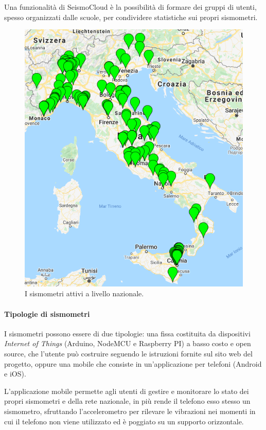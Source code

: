 Una funzionalità di SeismoCloud è la possibilità di formare dei gruppi di utenti, spesso organizzati dalle scuole, per condividere statistiche sui propri sismometri.
\begin{figure}[ht]
\centering
\includegraphics[scale=0.35]{assets/01/distribuzione_sismometri.png}
\caption{I sismometri attivi a livello nazionale.}
\label{fig:distribuzione}
\end{figure}

\paragraph{Tipologie di sismometri} I sismometri possono essere di due tipologie: una fissa costituita da dispositivi \textit{Internet of Things} (Arduino, NodeMCU e Raspberry PI) a basso costo e open source, che l'utente può costruire seguendo le istruzioni fornite sul sito web del progetto, oppure una mobile che consiste in un'applicazione per telefoni (Android e iOS).

L'applicazione mobile permette agli utenti di gestire e monitorare lo stato dei propri sismometri e della rete nazionale, in più rende il telefono esso stesso un sismometro, sfruttando l'accelerometro per rilevare le vibrazioni nei momenti in cui il telefono non viene utilizzato ed è poggiato su un supporto orizzontale.

